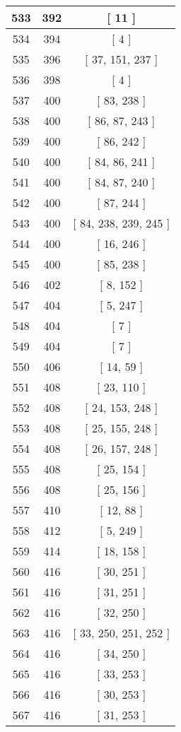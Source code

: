 \begin{center}
\begin{longtable}[H]{|| c c c ||}
\hline
533 & 392 & [ 11 ] \\ 
\hline
534 & 394 & [ 4 ] \\ 
\hline
535 & 396 & [ 37, 151, 237 ] \\ 
\hline
536 & 398 & [ 4 ] \\ 
\hline
537 & 400 & [ 83, 238 ] \\ 
\hline
538 & 400 & [ 86, 87, 243 ] \\ 
\hline
539 & 400 & [ 86, 242 ] \\ 
\hline
540 & 400 & [ 84, 86, 241 ] \\ 
\hline
541 & 400 & [ 84, 87, 240 ] \\ 
\hline
542 & 400 & [ 87, 244 ] \\ 
\hline
543 & 400 & [ 84, 238, 239, 245 ] \\ 
\hline
544 & 400 & [ 16, 246 ] \\ 
\hline
545 & 400 & [ 85, 238 ] \\ 
\hline
546 & 402 & [ 8, 152 ] \\ 
\hline
547 & 404 & [ 5, 247 ] \\ 
\hline
548 & 404 & [ 7 ] \\ 
\hline
549 & 404 & [ 7 ] \\ 
\hline
550 & 406 & [ 14, 59 ] \\ 
\hline
551 & 408 & [ 23, 110 ] \\ 
\hline
552 & 408 & [ 24, 153, 248 ] \\ 
\hline
553 & 408 & [ 25, 155, 248 ] \\ 
\hline
554 & 408 & [ 26, 157, 248 ] \\ 
\hline
555 & 408 & [ 25, 154 ] \\ 
\hline
556 & 408 & [ 25, 156 ] \\ 
\hline
557 & 410 & [ 12, 88 ] \\ 
\hline
558 & 412 & [ 5, 249 ] \\ 
\hline
559 & 414 & [ 18, 158 ] \\ 
\hline
560 & 416 & [ 30, 251 ] \\ 
\hline
561 & 416 & [ 31, 251 ] \\ 
\hline
562 & 416 & [ 32, 250 ] \\ 
\hline
563 & 416 & [ 33, 250, 251, 252 ] \\ 
\hline
564 & 416 & [ 34, 250 ] \\ 
\hline
565 & 416 & [ 33, 253 ] \\ 
\hline
566 & 416 & [ 30, 253 ] \\ 
\hline
567 & 416 & [ 31, 253 ] \\ 

\end{longtable}
\end{center}
